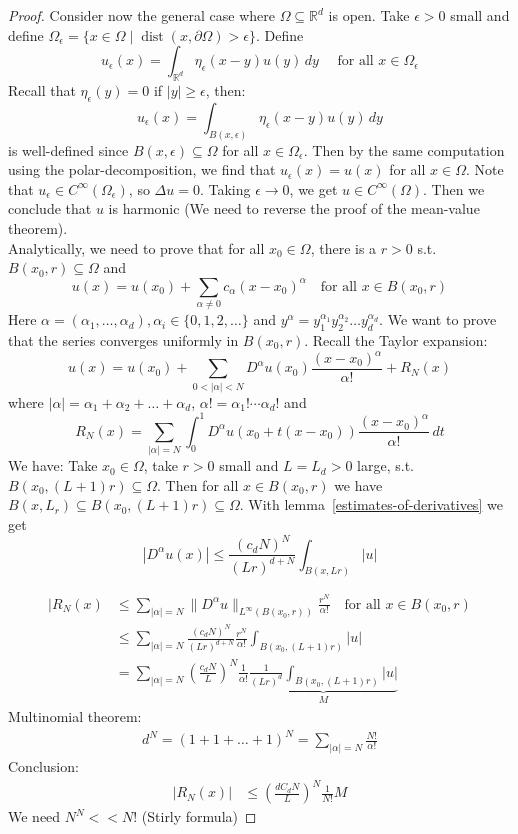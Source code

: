 \documentclass{report}
\theoremstyle{tommy}
\newcommand{\dist}{\operatorname{dist}}
\begin{document}
\begin{proof}
  Consider now the general case where \(\Omega \subseteq \mathbb{R}^d\) is open. Take \(\epsilon > 0\) small and define \(\Omega_\epsilon = \{x \in \Omega \mid \dist(x, \partial \Omega) > \epsilon\}\). 
  Define \[u_\epsilon(x) = \int_{\mathbb{R}^d} \eta_\epsilon(x-y) u(y) \, dy \quad \text{ for all } x \in \Omega_\epsilon\]
  Recall that \(\eta_\epsilon(y) = 0\) if \(|y| \ge \epsilon\), then:
  \[u_\epsilon(x) = \int_{B(x, \epsilon)} \eta_\epsilon(x-y)u(y) \, dy\]
  is well-defined since \(B(x,\epsilon) \subseteq \Omega\) for all \(x \in \Omega_\epsilon\).
  Then by the same computation using the polar-decomposition, we find that \(u_\epsilon(x) = u(x)\) for all \(x \in \Omega\). Note that \(u_\epsilon \in C^\infty(\Omega_\epsilon)\), so \(\Delta u = 0\). Taking \(\epsilon \to 0\), we get \(u \in C^\infty(\Omega)\). Then we conclude that \(u\) is harmonic (We need to reverse the proof of the mean-value theorem).\\
  Analytically, we need to prove that for all \(x_0 \in \Omega\), there is a \(r > 0\) s.t. \(B(x_0, r) \subseteq \Omega\) and \[u(x) = u(x_0) + \sum_{\alpha \ne 0} c_\alpha(x-x_0)^\alpha \quad \text{for  all } x \in B(x_0, r)\]
  Here \(\alpha = (\alpha_1, \dots, \alpha_d), \alpha_i \in \{0, 1, 2, \dots\}\) and \(y^\alpha = y_1^{\alpha_1}y_2^{\alpha_2} \dots y_d^{\alpha_d}\). 
  We want to prove that the series converges uniformly in \(B(x_0, r)\). Recall the Taylor expansion:
  \[u(x) = u(x_0) + \sum_{0 < |\alpha| < N} D^\alpha u(x_0) \frac{(x-x_0)^\alpha}{\alpha!} + R_N(x)\]
  where \(|\alpha| = \alpha_1 + \alpha_2 + \dots + \alpha_d\), \(\alpha! = \alpha_1! \cdots \alpha_d!\) and \[R_N(x) = \sum_{|\alpha| = N} \int_0^1 D^\alpha u(x_0 + t(x-x_0)) \frac{(x-x_0)^\alpha}{\alpha!} \, dt\]
  We have: Take \(x_0 \in \Omega\), take \(r > 0\) small and \(L = L_d > 0\) large, s.t. \(B(x_0, (L+1) r) \subseteq \Omega\). Then for all \(x \in B(x_0, r)\) we have \(B(x, L_r) \subseteq B(x_0, (L+1)r) \subseteq \Omega\). With lemma~\ref{estimates-of-derivatives} we get
  \[|D^\alpha u(x)| \le \frac{(c_d N)^N}{(Lr)^{d+N}} \int_{B(x, Lr)} |u|\]

  \begin{align*}
    |R_N(x) 
    &\le \sum_{|\alpha| = N} \|D^\alpha u\|_{L^\infty(B(x_0, r))} \frac{r^N}{\alpha!} \quad \text{for all } x \in B(x_0, r) \\
    &\le \sum_{|\alpha| = N} \frac{(c_d N)^N}{(Lr)^{d+N}} \frac{r^N}{\alpha!} \int_{B(x_0, (L+1) r)} |u| \\
    &= \sum_{|\alpha| = N} \left(\frac{c_d N}{L}\right)^N \frac{1}{\alpha!} \underbrace{ \frac{1}{(Lr)^d} \int_{B(x_0, (L+1)r)} |u|}_{M}
  \end{align*}
  Multinomial theorem:
  \begin{align*}
    d^N = (1+1+ \dots + 1)^N = \sum_{|\alpha| = N} \frac{N!}{\alpha!}
  \end{align*}
  Conclusion:
  \begin{align*}
    |R_N(x)| 
    &\le \left(\frac{d C_d N}{L}\right)^N \frac{1}{N!} M
  \end{align*}
  We need \(N^N << N!\) (Stirly formula)
\end{proof}
\end{document}
